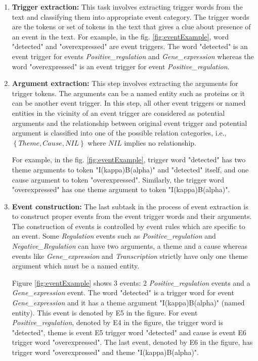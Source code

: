 \begin{enumerate}

\item \textbf{Trigger extraction:} This task involves extracting trigger words from the text and classifying them into appropriate event category. The trigger words are the tokens or set of tokens in the text that gives a clue about presence of an event in the text. For example, in the fig. \ref{fig:eventExample}, word "detected" and "overexpressed" are event triggers. The word "detected" is an event trigger for events \textit{Positive\_regulation} and \textit{Gene\_expression} whereas the word "overexpressed" is an event trigger for event \textit{Positive\_regulation}.

\item \textbf{Argument extraction: } This step involves extracting the arguments for trigger tokens. The arguments can be a named entity such as proteins or it can be another event trigger. In this step, all other event triggers or named entities in the vicinity of an event trigger are considered as potential arguments and the relationship between original event trigger and potential argument is classified into one of the possible relation categories, i.e., $\left\lbrace Theme, Cause, NIL \right\rbrace$ where $NIL$ implies no relationship.

For example, in the fig. \ref{fig:eventExample}, trigger word "detected" has two theme arguments to token "I(kappa)B(alpha)" and "detected" itself, and one cause argument to token "overexpressed". Similarly, the trigger word "overexpressed" has one theme argument to token "I(kappa)B(alpha)".

\item \textbf{Event construction: }  The last subtask in the process of event extraction is to construct proper events from the event trigger words and their arguments. The construction of events is controlled by event rules which are specific to an event. Some \textit{Regulation} events such as \textit{Positive\_regulation} and \textit{Negative\_Regulation} can have two arguments, a theme and a cause whereas events like \textit{Gene\_expression} and \textit{Transcription} strictly have only one theme argument which must be a named entity.

Figure \ref{fig:eventExample} shows 3 events: 2 \textit{Positive\_regulation} events and a \textit{Gene\_expression} event. The word "detected" is a trigger word for event \textit{Gene\_expression} and it has a theme argument "I(kappa)B(alpha)" (named entity). This event is denoted by E5 in the figure. For event \textit{Positive\_regulation}, denoted by E4 in the figure, the trigger word is "detected", theme is event E5 trigger word "detected" and cause is event E6 trigger word "overexpressed". The last event, denoted by E6 in the figure, has trigger word "overexpressed" and theme "I(kappa)B(alpha)".

\end{enumerate}


